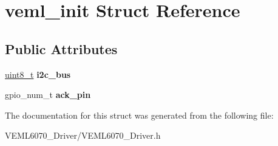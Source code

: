 \hypertarget{structveml__init}{}\section{veml\+\_\+init Struct Reference}
\label{structveml__init}
\subsection*{Public Attributes}
\begin{DoxyCompactItemize}
\item 
\mbox{\label{structveml__init_affe921782a5def8805ff4937d5d65d89}} 
\hyperlink{vl53l0x__types_8h_aba7bc1797add20fe3efdf37ced1182c5}{uint8\+\_\+t} {\bfseries i2c\+\_\+bus}
\item 
\mbox{\label{structveml__init_ab2752cd05e20a5b71f0f15b2d898e2b7}} 
gpio\+\_\+num\+\_\+t {\bfseries ack\+\_\+pin}
\end{DoxyCompactItemize}


The documentation for this struct was generated from the following file\+:\begin{DoxyCompactItemize}
\item 
V\+E\+M\+L6070\+\_\+\+Driver/V\+E\+M\+L6070\+\_\+\+Driver.\+h\end{DoxyCompactItemize}
